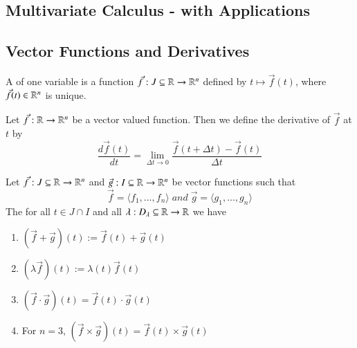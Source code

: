 \begin{appendices}
    \section{Multivariate Calculus - with Applications}
    
    \subsection{Vector Functions and Derivatives}
    
    \begin{defn}
        A  of one variable is a function $\vec{f}:J\subseteq \mathbb R\rightarrow \mathbb R^n$ defined by $t \mapsto \vec{f}(t)$, where $\vec{f}(t) \in \mathbb R^n$ is unique. 
    \end{defn}
    
    \begin{defn}
        Let $\vec{f}:\mathbb R\rightarrow \mathbb R^n$ be a vector valued function. Then we define the derivative of $\vec{f}$ at $t$ by \begin{equation}
            \frac{d\vec{f}(t)}{dt} = \lim\limits_{\Delta t\rightarrow 0} \frac{\vec{f}(t+\Delta t) - \vec{f}(t)}{\Delta t}
        \end{equation}
    \end{defn}
    
    \begin{rmk}[Properties]
        Let $\vec{f}:J\subseteq \mathbb R\rightarrow \mathbb R^n$ and $\vec{g}:I\subseteq \mathbb R\rightarrow \mathbb R^n$ be vector functions such that \begin{equation}
            \vec{f} = \langle f_1,...,f_n\rangle \; and\;\vec{g} = \langle g_1,...,g_n\rangle 
        \end{equation}
        The for all $t \in J \cap I$ and all $\lambda: D_{\lambda}\subseteq \mathbb R\rightarrow \mathbb R$ we have \begin{enumerate}
            \item $(\vec{f}+\vec{g})(t) := \vec{f}(t) + \vec{g}(t)$
            \item $(\lambda\vec{f})(t) := \lambda(t)\vec{f}(t)$
            \item $(\vec{f}\cdot\vec{g})(t) = \vec{f}(t)\cdot \vec{g}(t)$
            \item For $n = 3$, $(\vec{f} \times \vec{g})(t) = \vec{f}(t) \times \vec{g}(t)$
        \end{enumerate}
    \end{rmk}
        

\end{appendices}
